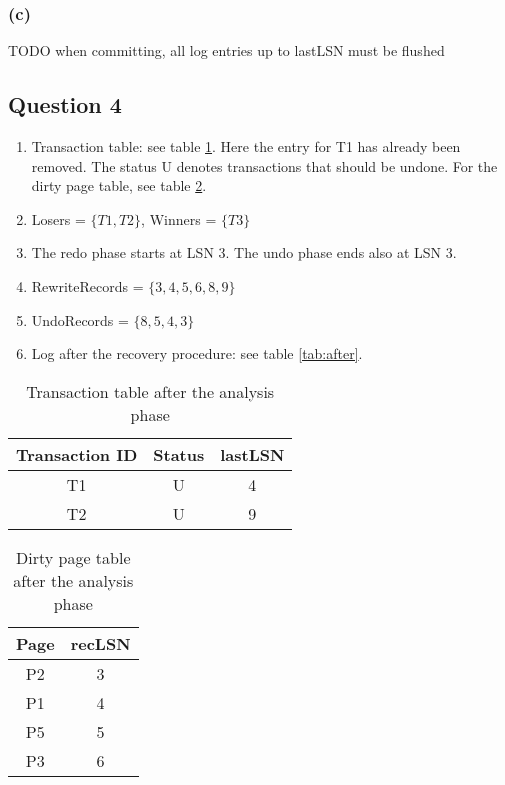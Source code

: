 \documentclass[12pt,a4paper]{article}
\begin{document}
\subsubsection*{(c)}
TODO
when committing, all log entries up to lastLSN must be flushed


\subsection*{Question 4}
\label{sec:eq4}

\begin{enumerate}
  \item Transaction table: see table \ref{tab:transactions}. Here the entry for T1 has already been removed. The status U denotes transactions that should be undone. For the dirty page table, see table \ref{tab:dirty}.
  \item Losers = $\{T1, T2\}$, Winners = $\{T3\}$
  \item The redo phase starts at LSN 3. The undo phase ends also at LSN 3. 
  \item RewriteRecords = $\{3,4,5,6,8,9\}$
  \item UndoRecords = $\{8,5,4,3\}$
  \item Log after the recovery procedure: see table \ref{tab:after}.
\end{enumerate}

\begin{table}
  \centering
  \begin{tabular}{c | c | c}
  Transaction ID & Status & lastLSN \\ \hline
  T1 & U & 4\\
  T2 & U & 9 
  \end{tabular}
  \caption{Transaction table after the analysis phase}
  \label{tab:transactions}
\end{table}

\begin{table}
  \centering
  \begin{tabular}{c|c}
  Page & recLSN \\ \hline
  P2 & 3 \\
  P1 & 4 \\
  P5 & 5 \\
  P3 & 6 
  \end{tabular}
  \caption{Dirty page table after the analysis phase}
  \label{tab:dirty}
\end{table}
\end{document}
